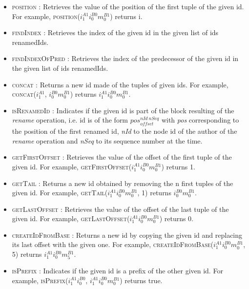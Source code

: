 \documentclass[10pt,journal,compsoc]{IEEEtran}
\newcommand{\ie}{i.e. }
\newcommand{\trm}[1]{\mathit{#1}}
\newcommand{\id}[3]{$\trm{#1}^{\trm{#2}}_{\trm{#3}}$}
\begin{document}
\begin{itemize}
    \item \textsc{position} : Retrieves the value of the position of the first tuple of the given id.
        For example, \textsc{position}(\id{i}{A1}{1}\id{i}{B0}{0}\id{m}{B1}{0}) returns i.
    \item \textsc{findIndex} : Retrieves the index of the given id in the given list of ids renamedIds.
    \item \textsc{findIndexOfPred} : Retrieves the index of the predecessor of the given id in the given list of ids renamedIds.
    \item \textsc{concat} : Returns a new id made of the tuples of given ids.
        For example, \textsc{concat}(\id{i}{A1}{1}, \id{i}{B0}{0}\id{m}{B1}{0}) returns \id{i}{A1}{1}\id{i}{B0}{0}\id{m}{B1}{0}.
    \item \textsc{isRenamedId} : Indicates if the given id is part of the block resulting of the \emph{rename} operation, \ie id is of the form \id{pos}{nId~nSeq}{offset} with \emph{pos} corresponding to the position of the first renamed id, \emph{nId} to the node id of the author of the \emph{rename} operation and \emph{nSeq} to its sequence number at the time.
    \item \textsc{getFirstOffset} : Retrieves the value of the offset of the first tuple of the given id.
        For example, \textsc{getFirstOffset}(\id{i}{A1}{1}\id{i}{B0}{0}\id{m}{B1}{0}) returns 1.
    \item \textsc{getTail} : Returns a new id obtained by removing the n first tuples of the given id.
        For example, \textsc{getTail}(\id{i}{A1}{1}\id{i}{B0}{0}\id{m}{B1}{0}, 1) returns \id{i}{B0}{0}\id{m}{B1}{0}.
    \item \textsc{getLastOffset} : Retrieves the value of the offset of the last tuple of the given id.
        For example, \textsc{getLastOffset}(\id{i}{A1}{1}\id{i}{B0}{0}\id{m}{B1}{0}) returns 0.
    \item \textsc{createIdFromBase} : Returns a new id by copying the given id and replacing its last offset with the given one.
        For example, \textsc{createIdFromBase}(\id{i}{A1}{1}\id{i}{B0}{0}\id{m}{B1}{0}, 5) returns \id{i}{A1}{1}\id{i}{B0}{0}\id{m}{B1}{5}.
    \item \textsc{isPrefix} : Indicates if the given id is a prefix of the other given id.
        For example, \textsc{isPrefix}(\id{i}{A1}{1}\id{i}{B0}{0}, \id{i}{A1}{1}\id{i}{B0}{0}\id{m}{B1}{0}) returns true.
\end{itemize}
\end{document}
